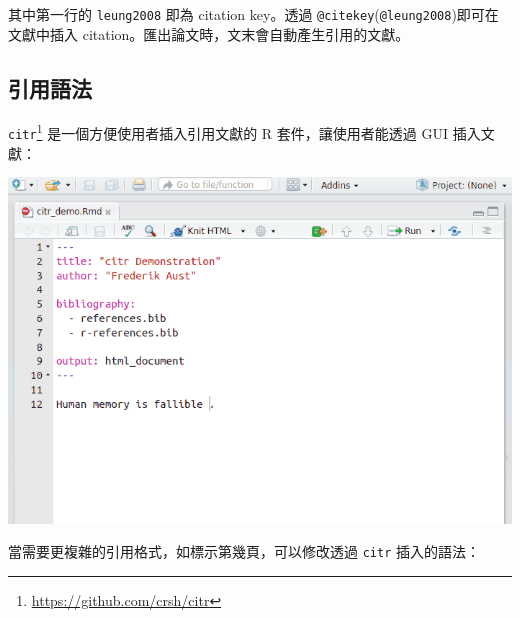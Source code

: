 \documentclass[oneside]{book}
\renewcommand{\href}[2]{#2\footnote{\url{#1}}}
\theoremstyle{definition}
\theoremstyle{definition}
\theoremstyle{definition}
\theoremstyle{remark}
\begin{document}
其中第一行的 \texttt{leung2008} 即為 citation key。透過
\texttt{@citekey}(\texttt{@leung2008})即可在文獻中插入
citation。匯出論文時，文末會自動產生引用的文獻。

\subsection{引用語法}\label{cite-syntax}

\href{https://github.com/crsh/citr}{\texttt{citr}}
是一個方便使用者插入引用文獻的 R 套件，讓使用者能透過 GUI 插入文獻：

\begin{center}\includegraphics[width=1\linewidth]{figs/citr} \end{center}

當需要更複雜的引用格式，如標示第幾頁，可以修改透過 \texttt{citr}
插入的語法：
\end{document}
